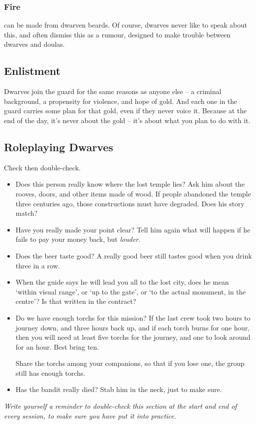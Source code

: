 \begin{multicols}{2}
\subsubsection{Fire }
can be made from dwarven beards.
Of course, dwarves never like to speak about this, and often dismiss this as a rumour, designed to make trouble between dwarves and \glspl{doula}.

\subsection{Enlistment}

Dwarves join the \gls{guard} for the same reasons as anyone else -- a criminal background, a propensity for violence, and hope of gold.
And each one in the \gls{guard} carries some plan for that gold, even if they never voice it.
Because at the end of the day, it's never about the gold -- it's about what you plan to do with it.

\subsection{Roleplaying Dwarves}

Check then double-check.

\begin{itemize}
  \item
  Does this person really know where the lost temple lies?
  Ask him about the rooves, doors, and other items made of wood.
  If people abandoned the temple three centuries ago, those constructions must have degraded.
  Does his story match?
  \item
  Have you really made your point clear?
  Tell him again what will happen if he fails to pay your money back, but \emph{louder}.
  \item
  Does the beer taste good?
  A really good beer still tastes good when you drink three in a row.
  \item
  When the guide says he will lead you all to the lost city, does he mean `within visual range', or `up to the gate', or `to the actual monument, in the centre'?
  Is that written in the contract?
  \item
  Do we have enough \glspl{torch} for this mission?
  If the last crew took two hours to journey down, and three hours back up, and if each \gls{torch} burns for one hour, then you will need at least five \glspl{torch} for the journey, and one to look around for an hour.
  Best bring ten.

  Share the \glspl{torch} among your companions, so that if you lose one, the group still has enough \glspl{torch}.
  \item
  Has the bandit really died?
  Stab him in the neck, just to make sure.
\end{itemize}

\emph{Write yourself a reminder to double-check this section at the start and end of every session, to make sure you have put it into practice.}

\end{multicols}

